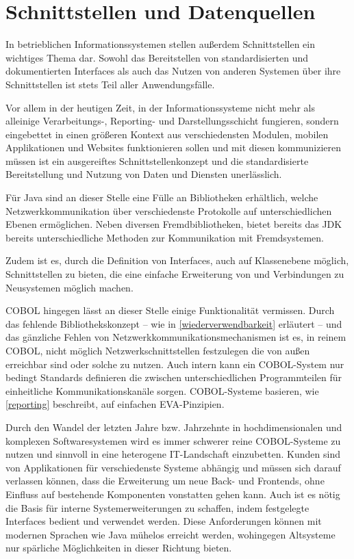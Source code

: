 \section{Schnittstellen und Datenquellen}\label{schnittstellenDatenquellen}

In betrieblichen Informationssystemen stellen außerdem Schnittstellen ein wichtiges Thema dar. Sowohl das Bereitstellen von standardisierten und dokumentierten Interfaces als auch das Nutzen von anderen Systemen über ihre Schnittstellen ist stets Teil aller Anwendungsfälle. 

Vor allem in der heutigen Zeit, in der Informationssysteme nicht mehr als alleinige Verarbeitungs-, Reporting- und Darstellungsschicht fungieren, sondern eingebettet in einen größeren Kontext aus verschiedensten Modulen, mobilen Applikationen und Websites funktionieren sollen und mit diesen kommunizieren müssen ist ein ausgereiftes Schnittstellenkonzept und die standardisierte Bereitstellung und Nutzung von Daten und Diensten unerlässlich.

Für Java sind an dieser Stelle eine Fülle an Bibliotheken erhältlich, welche Netzwerkkommunikation über verschiedenste Protokolle auf unterschiedlichen Ebenen ermöglichen. Neben diversen Fremdbibliotheken, bietet bereits das JDK bereits unterschiedliche Methoden zur Kommunikation mit Fremdsystemen.

Zudem ist es, durch die Definition von Interfaces, auch auf Klassenebene möglich, Schnittstellen zu bieten, die eine einfache Erweiterung von und Verbindungen zu Neusystemen möglich machen.

COBOL hingegen lässt an dieser Stelle einige Funktionalität vermissen. Durch das fehlende Bibliothekskonzept -- wie in \autoref{wiederverwendbarkeit} erläutert -- und das gänzliche Fehlen von Netzwerkkommunikationsmechanismen ist es, in reinem COBOL, nicht möglich Netzwerkschnittstellen festzulegen die von außen erreichbar sind oder solche zu nutzen. Auch intern kann ein COBOL-System nur bedingt Standards definieren die zwischen unterschiedlichen Programmteilen für einheitliche Kommunikationskanäle sorgen. COBOL-Systeme basieren, wie \autoref{reporting} beschreibt, auf einfachen EVA-Pinzipien.

Durch den Wandel der letzten Jahre bzw. Jahrzehnte in hochdimensionalen und komplexen Softwaresystemen wird es immer schwerer reine COBOL-Systeme zu nutzen und sinnvoll in eine heterogene IT-Landschaft einzubetten. Kunden sind von Applikationen für verschiedenste Systeme abhängig und müssen sich darauf verlassen können, dass die Erweiterung um neue Back- und Frontends, ohne Einfluss auf bestehende Komponenten vonstatten gehen kann. Auch ist es nötig die Basis für interne Systemerweiterungen zu schaffen, indem festgelegte Interfaces bedient und verwendet werden. Diese Anforderungen können mit modernen Sprachen wie Java mühelos erreicht werden, wohingegen Altsysteme nur spärliche Möglichkeiten in dieser Richtung bieten.